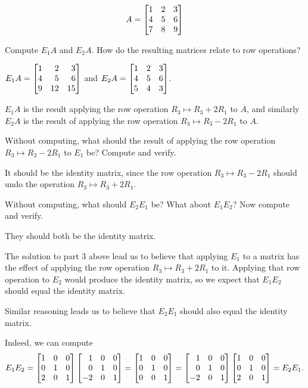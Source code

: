 
	\[
		A=\mat{1&2&3\\4&5&6\\7&8&9}
	\]
	\begin{parts}[resume]
		\item Compute $E_1A$ and $E_2A$. How do the resulting matrices relate to row
		operations?
			\begin{solution}
				$E_1A=\mat{1&2&3\\4&5&6\\9&12&15}$ and $E_2A=\mat{1&2&3\\4&5&6\\5&4&3}$.

				$E_1A$ is the result applying the row operation $R_3\mapsto R_3+2R_1$
				to $A$, and similarly $E_2A$ is the result of applying the row
				operation $R_3\mapsto R_3-2R_1$ to $A$.
			\end{solution}
		\item Without computing, what should the result of applying the row
		operation $R_3\mapsto R_3-2R_1$ to $E_1$ be? Compute and verify.
			\begin{solution}
				It should be the identity matrix, since the row operation
				$R_3\mapsto R_3-2R_1$ should undo the operation $R_3\mapsto R_3+2R_1$.
			\end{solution}
		\item Without computing, what should $E_2E_1$ be? What about $E_1E_2$?
		Now compute and verify.
			\begin{solution}
				They should both be the identity matrix.

				The solution to part 3 above lead us to believe that applying $E_1$
				to a matrix has the effect of applying the row operation $R_3\mapsto R_3+2R_1$
				to it. Applying that row operation to $E_2$ would produce the
				identity matrix, so we expect that $E_1E_2$ should equal the
				identity matrix.

				Similar reasoning leads us to believe that $E_2E_1$ should also
				equal the identity matrix.

				Indeed, we can compute
				\[
					E_1E_2
					=\mat{1&0&0\\0&1&0\\2&0&1}\mat{1&0&0\\0&1&0\\-2&0&1}
					=\mat{1&0&0\\0&1&0\\0&0&1}
					=\mat{1&0&0\\0&1&0\\-2&0&1}\mat{1&0&0\\0&1&0\\2&0&1}
					=E_2E_1.
				\]
			\end{solution}
	\end{parts}

